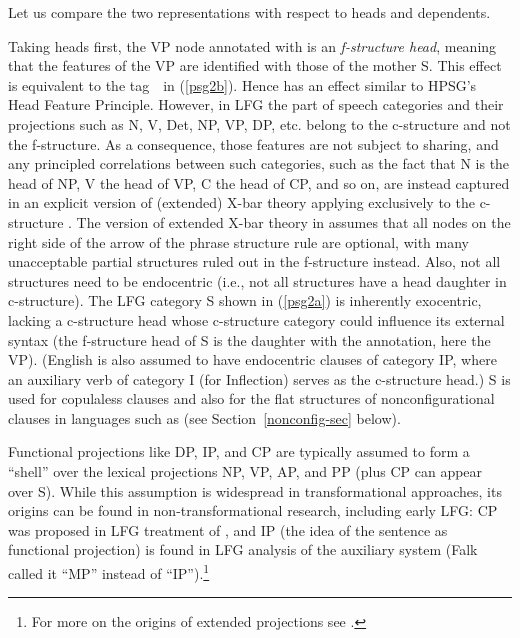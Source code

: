 \noindent
Let us compare the two representations with respect to heads and dependents.

Taking heads first, the VP node annotated with \updown{} is an \textit{f-structure head}, meaning that the features of the VP are identified with those of the mother S.  This effect is equivalent to the tag\ \ in (\ref{psg2b}).    Hence  \updown{} has an effect similar to HPSG's Head Feature Principle.  However, in LFG the part of speech categories and their projections such as N, V, Det, NP, VP, DP, etc. belong to the c-structure and not the f-structure.  As a consequence, those features are not subject to sharing, and any principled correlations between such categories, such as the fact that N is the head of NP, V the head of VP, C the head of CP, and so on, are instead captured in an explicit version of (extended) X-bar theory applying exclusively to the c-structure \citep{grimshaw98}.  The version of extended X-bar theory in \citet[Chapter 6]{BATW2016a} assumes that all nodes on the right side of the arrow of the phrase structure rule are optional, with many unacceptable partial structures ruled out in the f-structure instead.  Also, not all structures need to be endocentric (i.e., not all structures have a head daughter in c-structure).  The LFG category S shown in (\ref{psg2a}) is inherently exocentric, lacking a  c-structure head whose c-structure category could influence its external syntax (the f-structure head of S is the daughter with the \updown{} annotation, here the VP).   (English is also assumed to have endocentric clauses of category IP, where an auxiliary verb of category I (for Inflection) serves as the c-structure head.)  S is used for copulaless clauses and also for the flat structures of nonconfigurational clauses in languages such as  (see Section~\ref{nonconfig-sec} below).   

Functional projections like DP, IP, and CP are typically assumed to form a ``shell'' over the lexical projections NP, VP, AP, and PP (plus CP can appear over S).  While this assumption is widespread in transformational approaches, its origins can be found in non-transformational  research, including early LFG:  CP was proposed in  LFG treatment of , and IP (the idea of the sentence as functional projection) is found in  LFG analysis of the  auxiliary system (Falk called it ``MP'' instead of ``IP'').\footnote{For more on the origins of extended projections see \citet[124--5]{BATW2016a}.}  

